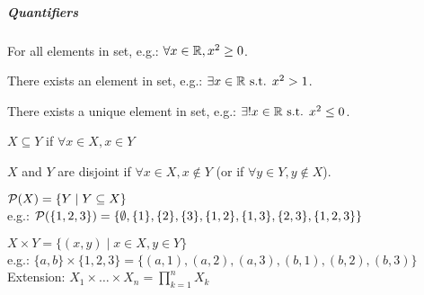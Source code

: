 \subparagraph{Quantifiers}
\begin{notation}[$\forall$]
	For all elements in set, e.g.: $\forall x \in \mathbb{R}, x^2 \geq 0$.
\end{notation}
\begin{notation}[$\exists$]
	There exists an element in set, e.g.: $\exists x \in \mathbb{R} \text{ s.t. } x^2 > 1$.
\end{notation}
\begin{notation}[$\exists !$]
	There exists a unique element in set, e.g.: $\exists ! x \in \mathbb{R} \text{ s.t. } x^2 \leq 0$.
\end{notation}
\begin{definition}
	$X \subseteq Y$ if $\forall x \in X, x \in Y$
\end{definition}
\begin{definition}
	$X$ and $Y$ are disjoint if $\forall x \in X, x \not\in Y$ (or if $\forall y \in Y, y \not\in X$).
\end{definition}

\begin{definition}[Powerset]
	$\mathcal{P}(X) = \{ Y \mid Y \subseteq X \}$\\
	e.g.: $\mathcal{P}(\{1,2,3\})=\{ \emptyset, \{1\},\{2\},\{3\}, \{1,2\},\{1,3\},\{2,3\}, \{1,2,3\} \}$
\end{definition}
\begin{definition}
	$X \times Y = \{ (x,y) \mid x \in X, y \in Y \}$\\
	e.g.: $\{a,b\} \times \{1,2,3\} = \{ (a,1),(a,2),(a,3), (b,1),(b,2),(b,3) \}$\\
	Extension: $X_1 \times \dots \times X_n = \prod_{k=1}^n X_k$
\end{definition}




